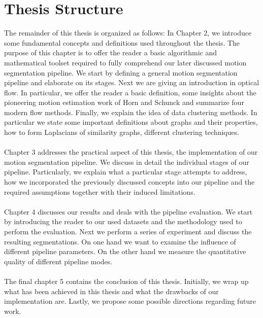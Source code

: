 \section{Thesis Structure}
The remainder of this thesis is organized as follows: In Chapter 2, we introduce some fundamental concepts and definitions used throughout the thesis. The purpose of this chapter is to offer the reader a basic algorithmic and mathematical toolset required to fully comprehend our later discussed motion segmentation pipeline. We start by defining a general motion segmentation pipeline and elaborate on its stages. Next we are giving an introduction in optical flow. In particular, we offer the reader a basic definition, some insights about the pioneering motion estimation work of Horn and Schunck and summarize four modern flow methods. Finally, we explain the idea of data clustering methods. In particular we state some important definitions about graphs and their properties, how to form Laplacians of similarity graphs, different clustering techniques. \\ \\
Chapter 3 addresses the practical aspect of this thesis, the implementation of our motion segmentation pipeline. We discuss in detail the individual stages of our pipeline. Particularly, we explain what a particular stage attempts to address, how we incorporated the previously discussed concepts into our pipeline and the required assumptions together with their induced limitations. \\ \\
Chapter 4 discusses our results and deals with the pipeline evaluation. We start by introducing the reader to our used datasets and the methodology used to perform the evaluation. Next we perform a series of experiment and discuss the resulting segmentations. On one hand we want to examine the influence of different pipeline parameters. On the other hand we measure the quantitative quality of different pipeline modes. \\ \\
The final chapter 5 contains the conclusion of this thesis. Initially, we wrap up what has been achieved in this thesis and what the drawbacks of our implementation are. Lastly, we propose some possible directions regarding future work.